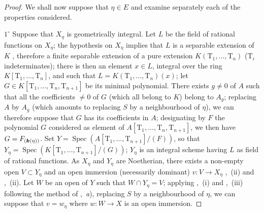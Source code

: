 \begin{proof}
We shall now suppose that $\eta\in E$ and examine separately each of the properties considered.

$1^\circ$ Suppose that $X_\eta$ is geometrically integral.
Let $L$ be the field of rational functions on $X_\eta$; the hypothesis on $X_\eta$ implies that $L$ is a separable extension of $K$ , therefore a finite separable extension of a pure extension $K(\mathrm{T}_1,\ldots,\mathrm{T}_n)$ ($\mathrm{T}_i$ indeterminates); there is then an element $x\in L$, integral over the ring $K[\mathrm{T}_1,\ldots,\mathrm{T}_n]$, and such that $L=K(\mathrm{T}_1,\ldots,\mathrm{T}_n)(x)$; let $G\in K[\mathrm{T}_1,\ldots,\mathrm{T}_n,\mathrm{T}_{n+1}]$ be its minimal polynomial.
There exists $g\neq 0$ of $A$ such that all the coefficients $\neq 0$ of $G$ (which all belong to $K$) belong to $A_g$; replacing $A$ by $A_g$ (which amounts to replacing $S$ by a neighbourhood of $\eta$), we can therefore suppose that $G$ has its coefficients in $A$; designating by $F$ the polynomial $G$ considered as element of $A[\mathrm{T}_1,\ldots,\mathrm{T}_n,\mathrm{T}_{n+1}]$, we then have $G=F_{(\boldsymbol{k}(\eta))}$.
Set $Y=\operatorname{Spec}(A[\mathrm{T}_1,\ldots,\mathrm{T}_{n+1}]/(F))$, so that $Y_\eta=\operatorname{Spec}(K[\mathrm{T}_1,\ldots,\mathrm{T}_{n+1}]/(G))$; $Y_\eta$ is an integral scheme having $L$ as field of rational functions.
As $X_\eta$ and $Y_\eta$ are Noetherian, there exists a non-empty open $V\subset Y_\eta$ and an open immersion (necessarily dominant) $v:V\to X_\eta$ ,~(ii) and ,~(ii).
Let $W$ be an open of $Y$ such that $W\cap Y_\eta=V$; applying ,~(i) and ,~(iii) following the method of ,~\emph{a}), replacing $S$ by a neighbourhood of $\eta$, we can suppose that $v=w_\eta$ where $w:W\to X$ is an open immersion.


\end{proof}
